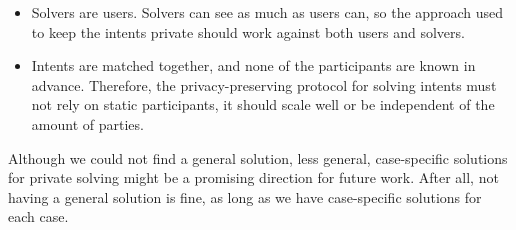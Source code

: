 \documentclass[
    9pt,            %
    report,        %
    affiltop,       %
]{art}
\begin{document}
\begin{itemize}
    \item Solvers are users. Solvers can see as much as users can, so the approach used to keep the intents private should work against both users and solvers.
    \item Intents are matched together, and none of the participants are known in advance. Therefore, the privacy-preserving protocol for solving intents must not rely on static participants, it should scale well or be independent of the amount of parties.
\end{itemize}

Although we could not find a general solution, less general, case-specific solutions for private solving might be a promising direction for future work. After all, not having a general solution is fine, as long as we have case-specific solutions for each case.


\nocite{*}

\end{document}
